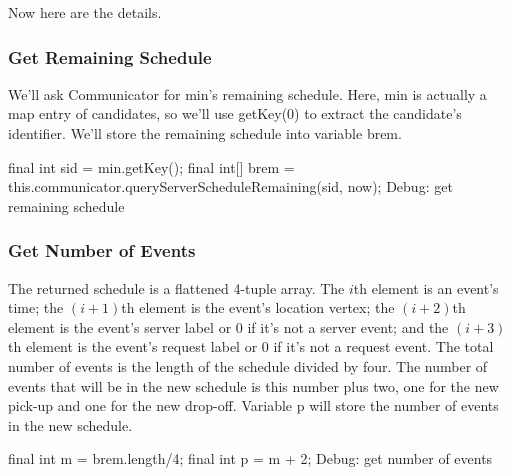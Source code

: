 Now here are the details.

\subsubsection{Get Remaining Schedule}

We'll ask {\Tt{}Communicator\nwendquote} for {\Tt{}min\nwendquote}'s remaining schedule. Here, {\Tt{}min\nwendquote} is
actually a map entry of {\Tt{}candidates\nwendquote}, so we'll use {\Tt{}getKey\nwendquote}(0) to extract
the candidate's identifier. We'll store the remaining schedule into
variable {\Tt{}brem\nwendquote}.

\nwenddocs{}\endmoddef\nwstartdeflinemarkup{}\nwenddeflinemarkup
final int sid = min.getKey();
final int[] brem = this.communicator.queryServerScheduleRemaining(sid, now);
\LA{}Debug: get remaining schedule~{\nwtagstyle{}}\RA{}
\nwendcode{}\nwdocspar

\subsubsection{Get Number of Events}

The returned schedule is a flattened 4-tuple array. The $i$th element is an
event's time; the $(i+1)$th element is the event's location vertex; the
$(i+2)$th element is the event's server label or 0 if it's not a server event;
and the $(i+3)$th element is the event's request label or 0 if it's not a
request event. The total number of events is the length of the schedule divided
by four. The number of events that will be in the new schedule is this number
plus two, one for the new pick-up and one for the new drop-off. Variable
{\Tt{}p\nwendquote} will store the number of events in the new schedule.

\nwenddocs{}\endmoddef\nwstartdeflinemarkup{}\nwenddeflinemarkup
final int m = brem.length/4;
final int p = m + 2;
\LA{}Debug: get number of events~{\nwtagstyle{}}\RA{}
\nwendcode{}\nwdocspar


